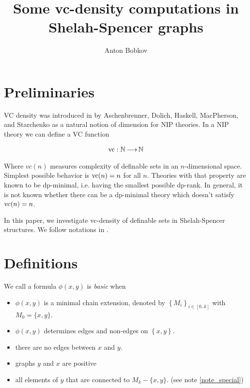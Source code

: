 \documentclass{amsart}
\title{Some vc-density computations in Shelah-Spencer graphs}
\author{Anton Bobkov}
\newcommand{\curly}[1]{\left\{#1\right\}}
\begin{document}
\maketitle

\section{Preliminaries}

VC density was introduced in \cite{vc_density} by Aschenbrenner, Dolich, Haskell, MacPherson, and Starchenko as a natural notion of dimension for NIP theories. In a NIP theory we can define a VC function

\begin{align*}
	\operatorname{vc} : \mathbb{N} \operatorname{\longrightarrow} \mathbb{N}
\end{align*}

Where $vc(n)$ measures complexity of definable sets in an $n$-dimensional space. Simplest possible behavior is $\operatorname{vc}(n) = n$ for all $n$. Theories with that property are known to be dp-minimal, i.e. having the smallest possible dp-rank. In general, it is not known whether there can be a dp-minimal theory which doesn't satisfy $\operatorname{vc}(n)=n$.

In this paper, we investigate vc-density of definable sets in Shelah-Spencer structures. We follow notations in \cite{laskowski}.

\section{Definitions}

\begin{Definition}
	We call a formula $\phi(x, y)$ is \emph{basic} when
	\begin{itemize}
		\item $\phi(x, y)$ is a minimal chain extension, denoted by $\curly{M_i}_{i \in [0..k]}$ with $M_0 = \{x, y\}$.
		\item $\phi(x, y)$ determines edges and non-edges on $\curly{x, y}$.
		\item there are no edges between $x$ and $y$.
		\item graphs $y$ and $x$ are positive
		\item all elements of $y$ that are connected to $M_k - \{x,y\}$. (see note \ref{note_special})
	\end{itemize}
\end{Definition}
\end{document}
